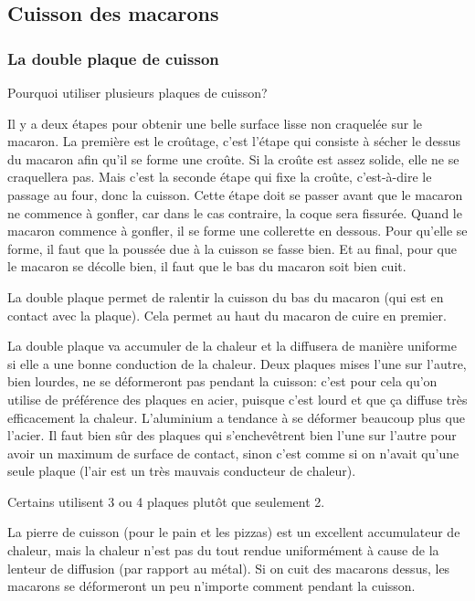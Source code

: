\documentclass[a4paper]{article}
\begin{document}
\subsection{Cuisson des macarons}

\subsubsection{La double plaque de cuisson}
Pourquoi utiliser  plusieurs plaques de  cuisson?  

Il y a deux étapes pour  obtenir une belle surface lisse non craquelée
sur  le  macaron. La  première  est  le  croûtage, c'est  l'étape  qui
consiste à sécher le dessus du macaron afin qu'il se forme une croûte.
Si la croûte est assez solide,  elle ne se craquellera pas. Mais c'est
la seconde étape qui fixe  la croûte, c'est-à-dire le passage au four,
donc la  cuisson. Cette étape doit  se passer avant que  le macaron ne
commence à gonfler, car dans le cas contraire, la coque sera fissurée.
Quand le  macaron commence  à gonfler, il  se forme une  collerette en
dessous.  Pour qu'elle  se forme,  il  faut que  la poussée  due à  la
cuisson se  fasse bien. Et  au final, pour  que le macaron  se décolle
bien, il faut que le bas du macaron soit bien cuit.

La double plaque permet de ralentir  la cuisson du bas du macaron (qui
est en  contact avec la  plaque).  Cela permet  au haut du  macaron de
cuire en premier.  

La double plaque va accumuler de la chaleur et la diffusera de manière
uniforme si elle  a une bonne conduction de  la chaleur.  Deux plaques
mises l'une sur  l'autre, bien lourdes, ne se  déformeront pas pendant
la cuisson: c'est pour cela qu'on utilise de préférence des plaques en
acier,  puisque c'est  lourd et  que ça  diffuse très  efficacement la
chaleur.   L'aluminium a  tendance  à se  déformer  beaucoup plus  que
l'acier. Il  faut bien sûr  des plaques qui s'enchevêtrent  bien l'une
sur l'autre pour  avoir un maximum de surface  de contact, sinon c'est
comme si  on n'avait  qu'une seule plaque  (l'air est un  très mauvais
conducteur de chaleur).

Certains utilisent 3 ou 4 plaques plutôt que seulement 2.

La pierre  de cuisson (pour  le pain et  les pizzas) est  un excellent
accumulateur  de chaleur,  mais la  chaleur n'est  pas du  tout rendue
uniformément  à cause  de  la  lenteur de  diffusion  (par rapport  au
métal). Si on cuit des macarons dessus, les macarons se déformeront un
peu n'importe comment pendant la cuisson.
\end{document}
